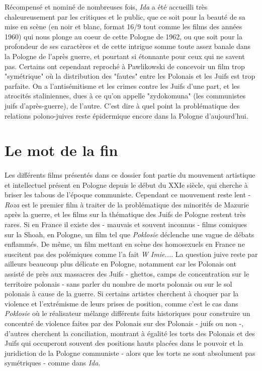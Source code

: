 \documentclass[12pt]{amsart}
\begin{document}
\begin{multicols}{2}
Récompensé et nominé de nombreuses fois, \emph{Ida} a été accueilli très chaleureusement par les critiques et le public, que ce soit pour la beauté de sa mise en scène (en noir et blanc, format 16/9 tout comme les films des années 1960) qui nous plonge au coeur de cette Pologne de 1962, ou que soit pour la profondeur de ses caractères et de cette intrigue somme toute assez banale dans la Pologne de l'après guerre, et pourtant si étonnante pour ceux qui ne savent pas. Certains ont cependant reproché à Pawlikowski de concevoir un film trop "symétrique" où la distribution des "fautes" entre les Polonais et les Juifs est trop parfaite. On a l'antisémitisme et les crimes contre les Juifs d'une part, et les atrocités staliniennes, dues à ce qu'on appelle "zydokomuna" (les communistes juifs d'après-guerre), de l'autre. C'est dire à quel point la problématique des relations polono-juives reste épidermique encore dans la Pologne d'aujourd'hui. 

\clearpage

\section*{Le mot de la fin}
\vspace*{10mm}
\paragraph*{}
Les différents films présentés dans ce dossier font partie du mouvement artistique et intellectuel présent en Pologne depuis le début du XXIe siècle, qui cherche à briser les tabous de l'époque communiste. Cependant ce mouvement reste lent - \emph{Roza} est le premier film à traiter de la problématique des minorités de Mazurie après la guerre, et les films sur la thématique des Juifs de Pologne restent très rares. Si en France il existe des - mauvais et souvent inconnus - films comiques sur la Shoah, en Pologne, un film tel que \emph{Poklosie} déclenche une vague de débats enflammés. De même, un film mettant en scène des homosexuels en France ne suscitent pas des polémiques comme l'a fait \emph{W Imie...}. La question juive reste par ailleurs beaucoup plus délicate en Pologne, notamment car les Polonais ont assisté de près aux massacres des Juifs - ghettos, camps de concentration sur le territoire polonais - sans parler du nombre de morts polonais ou sur le sol polonais à cause de la guerre. Si certains artistes cherchent à choquer par la violence et l'extrémisme de leurs prises de position, comme c'est le cas dans \emph{Poklosie} où le réalisateur mélange différents faits historiques pour construire un concentré de violence faites par des Polonais sur des Polonais - juifs ou non -, d'autres cherchent la conciliation, montrant à égalité les torts des Polonais et des Juifs qui occuperont souvent des positions hauts placées dans le pouvoir et la juridiction de la Pologne communiste - alors que les torts ne sont absolument pas symétriques - comme dans \emph{Ida}.


\end{multicols}
\end{document}
